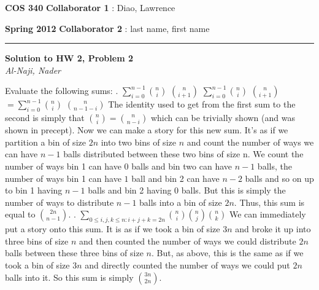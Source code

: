 \documentclass[12pt]{article}
\newcommand{\myheader}[4]
{\vspace*{-0.5in}
\noindent
{#1} \hfill {#3}

\noindent
{#2} \hfill {#4}

\noindent
\rule[8pt]{\textwidth}{1pt}

\vspace{1ex} 
}  %
\newcommand{\myalgsheader}[0]
{\myheader
{ {\bf{COS 340}} }
{ {\bf{Spring 2012}} }
{ {\bf{Collaborator 1}} : Diao, Lawrence }
{ {\bf{Collaborator 2}} : last name, first name}
}
\newcommand{\myhwtitle}[3]
{\begin{center}
{\large {\bf Solution to HW {#1}, Problem {#2}}}\\
\medskip 
{\it {#3}} %
\end{center}}
\begin{document}
\pagebreak
\myalgsheader
\pagestyle{plain}
\myhwtitle{2}{2}{Al-Naji, Nader}
\bigskip
Evaluate the following sums:
\newline
{}. $\sum\limits_{i=0}^{n-1} $$n \choose i$ $n \choose {i+1}$
\newline
\newline
$\sum\limits_{i=0}^{n-1} $$n \choose i$ $n \choose {i+1}$$ = \sum\limits_{i=0}^{n-1} $$n \choose i$ $n \choose {n-1-i}$
\newline
The identity used to get from the first sum to the second is simply that $n\choose i$$=$$n \choose {n-i}$
which can be trivially shown (and was shown in precept). Now we can make a story for this new sum. It's 
as if we partition a bin of size $2n$ into two bins of size $n$ and count the number of ways we can have
$n-1$ balls distributed between these two bins of size n. We count the number of ways bin 1 can have $0$
balls and bin two can have $n-1$ balls, the number of ways bin 1 can have $1$ ball and bin 2 can have $n-2$ balls
and so on up to bin 1 having $n-1$ balls and bin 2 having $0$ balls. But this is simply the number of 
ways to distribute $n-1$ balls into a bin of size $2n$. Thus, this sum is equal to $2n \choose {n-1}$.
\newline
{}. $\sum\limits_{0 \leq i,j,k \leq n \colon i+j+k = 2n}^{}$$n\choose i$$n \choose j$$n \choose k$
\newline
\newline
We can immediately put a story onto this sum. It is as if we took a bin of size $3n$ and broke it up
into three bins of size $n$ and then counted the number of ways we could distribute $2n$ balls between
these three bins of size $n$. But, as above, this is the same as if we took a bin of size $3n$ and  directly
counted the number of ways we could put $2n$ balls into it. So this sum is simply $3n \choose 2n$.
\end{document}
